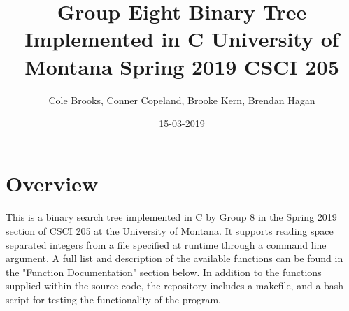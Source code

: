 \documentclass{article}
\title{Group Eight Binary Tree Implemented in C University of Montana Spring 2019 CSCI 205}
\date{15-03-2019}
\author{Cole Brooks, Conner Copeland, Brooke Kern, Brendan Hagan}
\begin{document}
\maketitle
{}
\newpage
{}
\newpage
{}

\section{Overview}
\paragraph{}
This is a binary search tree implemented in C by Group 8 in the Spring 2019 section of CSCI 205 at the University of Montana. It supports reading space separated integers from a file specified at runtime through a command line argument. A full list and description of the available functions can be found in the "Function Documentation" section below. In addition to the functions supplied within the source code, the repository includes a makefile, and a bash script for testing the functionality of the program.
\end{document}
